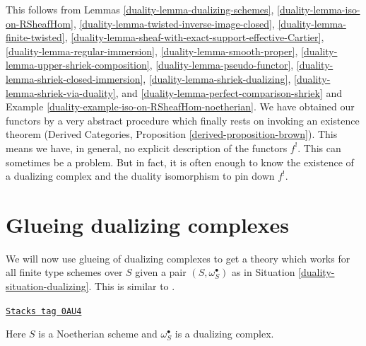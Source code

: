 This follows from Lemmas
\ref{duality-lemma-dualizing-schemes},
\ref{duality-lemma-iso-on-RSheafHom},
\ref{duality-lemma-twisted-inverse-image-closed},
\ref{duality-lemma-finite-twisted},
\ref{duality-lemma-sheaf-with-exact-support-effective-Cartier},
\ref{duality-lemma-regular-immersion},
\ref{duality-lemma-smooth-proper},
\ref{duality-lemma-upper-shriek-composition},
\ref{duality-lemma-pseudo-functor},
\ref{duality-lemma-shriek-closed-immersion},
\ref{duality-lemma-shriek-dualizing},
\ref{duality-lemma-shriek-via-duality}, and
\ref{duality-lemma-perfect-comparison-shriek} and
Example \ref{duality-example-iso-on-RSheafHom-noetherian}.
We have obtained our functors by a very abstract procedure
which finally rests on invoking an existence theorem
(Derived Categories, Proposition \ref{derived-proposition-brown}).
This means we have, in general, no explicit description of the functors $f^!$.
This can sometimes be a problem. But in fact, it is often enough to know
the existence of a dualizing complex and the duality isomorphism
to pin down $f^!$.

\section{Glueing dualizing complexes}
\label{duality-section-glue}
We will now use glueing of dualizing complexes to get a theory which works for
all finite type schemes over $S$ given a pair $(S, \omega_S^\bullet)$
as in Situation \ref{duality-situation-dualizing}. This is similar to
\cite[Remark on page 310]{RD}.

\begin{definition}
\label{duality-situation-dualizing}
\href{https://stacks.math.columbia.edu/tag/0AU4}{\texttt{Stacks tag 0AU4}}

Here $S$ is a Noetherian scheme and $\omega_S^\bullet$ is a dualizing
complex.
\end{definition}

